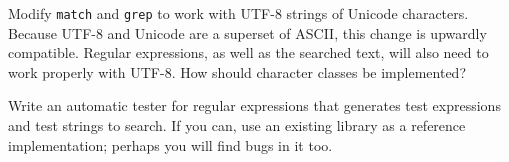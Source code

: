 \begin{exercise}
    Modify \verb'match' and \verb'grep' to work with UTF-8 strings of
    Unicode characters. Because UTF-8 and Unicode are a superset of ASCII,
    this change is upwardly compatible. Regular expressions, as well as the
    searched text, will also need to work properly with UTF-8. How should
    character classes be implemented?
\end{exercise}

\begin{exercise}
    Write an automatic tester for regular expressions that generates test
    expressions and test strings to search. If you can, use an existing
    library as a reference implementation; perhaps you will find bugs in it
    too.
\end{exercise}
